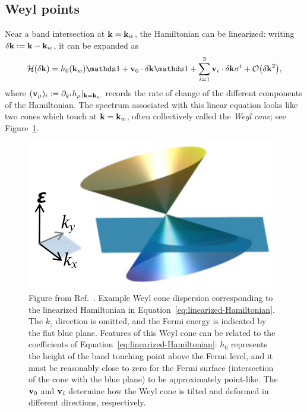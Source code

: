 \subsection{Weyl points}
Near a band intersection at $\vb{k}=\vb{k}_w$, the Hamiltonian can be linearized: writing $\delta\vb{k} := \vb{k} - \vb{k}_w$, it can be expanded as
\begin{equation}\label{eq:linearized-Hamiltonian}
	\Hc(\delta\k) = h_0(\k_w)\Id + \vb{v}_0\cdot\delta\k\Id + \sum_{i=1}^{3}\vb{v}_i\cdot\delta\k \sigma^i + \order{\delta\k^2},
\end{equation}
where $(\vb{v}_\mu)_i := \partial_{k^i}h_\mu |_{\vb{k}=\vb{k}_w}$ records the rate of change of the different components of the Hamiltonian. The spectrum associated with this linear equation looks like two cones which touch at $\vb{k}=\vb{k}_w$, often collectively called the \emph{Weyl cone}; see Figure~\ref{fig:Weyl-cone}.
\begin{figure}[htb!]
	\centering
	\includegraphics[width=.5\linewidth]{Images/Weyl-cone}
	\caption{Figure from Ref.~\cite{Zhang_Berry}. Example Weyl cone dispersion corresponding to the linearized Hamiltonian in Equation~\eqref{eq:linearized-Hamiltonian}. The $k_z$ direction is omitted, and the Fermi energy is indicated by the flat blue plane. Features of this Weyl cone can be related to the coefficients of Equation~\eqref{eq:linearized-Hamiltonian}: $h_0$ represents the height of the band touching point above the Fermi level, and it must be reasonably close to zero for the Fermi surface (intersection of the cone with the blue plane) to be approximately point-like. The $\vb{v}_0$ and $\vb{v}_i$ determine how the Weyl cone is tilted and deformed in different directions, respectively.}
	\label{fig:Weyl-cone}
\end{figure}
